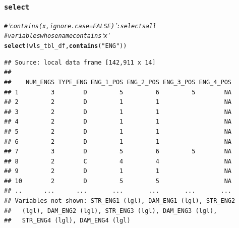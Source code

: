 \documentclass{beamer}\usepackage[]{graphicx}\usepackage[]{color}
\makeatletter
\newcommand{\hlstr}[1]{\textcolor[rgb]{0.192,0.494,0.8}{#1}}%
\newcommand{\hlcom}[1]{\textcolor[rgb]{0.678,0.584,0.686}{\textit{#1}}}%
\newcommand{\hlstd}[1]{\textcolor[rgb]{0.345,0.345,0.345}{#1}}%
\newcommand{\hlkwd}[1]{\textcolor[rgb]{0.737,0.353,0.396}{\textbf{#1}}}%
\newenvironment{kframe}{%
 \def\at@end@of@kframe{}%
 \ifinner\ifhmode%
  \def\at@end@of@kframe{\end{minipage}}%
  \begin{minipage}{\columnwidth}%
 \fi\fi%
 \def\FrameCommand##1{\hskip\@totalleftmargin \hskip-\fboxsep
 \colorbox{shadecolor}{##1}\hskip-\fboxsep
     \hskip-\linewidth \hskip-\@totalleftmargin \hskip\columnwidth}%
 \MakeFramed {\advance\hsize-\width
   \@totalleftmargin\z@ \linewidth\hsize
   \@setminipage}}%
 {\par\unskip\endMakeFramed%
 \at@end@of@kframe}
\newenvironment{knitrout}{}{} %
\makeatother
\begin{document}
\begin{frame}[fragile]
  \frametitle{{\tt select}}
\begin{knitrout}\footnotesize
{}\color{fgcolor}\begin{kframe}
\begin{alltt}
\hlcom{# ‘contains(x, ignore.case = FALSE)’: selects all}
\hlcom{# variables whose name  contains ‘x’}
\hlkwd{select}\hlstd{(wls_tbl_df,} \hlkwd{contains}\hlstd{(}\hlstr{"ENG"}\hlstd{))}
\end{alltt}
\begin{verbatim}
## Source: local data frame [142,911 x 14]
## 
##    NUM_ENGS TYPE_ENG ENG_1_POS ENG_2_POS ENG_3_POS ENG_4_POS
## 1         3        D         5         6         5        NA
## 2         2        D         1         1                  NA
## 3         2        D         1         1                  NA
## 4         2        D         1         1                  NA
## 5         2        D         1         1                  NA
## 6         2        D         1         1                  NA
## 7         3        D         5         6         5        NA
## 8         2        C         4         4                  NA
## 9         2        D         1         1                  NA
## 10        2        D         5         5                  NA
## ..      ...      ...       ...       ...       ...       ...
## Variables not shown: STR_ENG1 (lgl), DAM_ENG1 (lgl), STR_ENG2
##   (lgl), DAM_ENG2 (lgl), STR_ENG3 (lgl), DAM_ENG3 (lgl),
##   STR_ENG4 (lgl), DAM_ENG4 (lgl)
\end{verbatim}
\end{kframe}
\end{knitrout}
\end{frame} 
\end{document}
